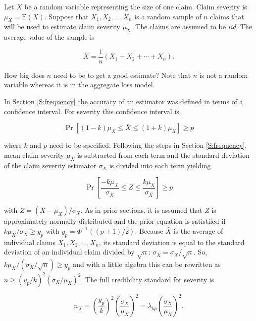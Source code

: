 \documentclass[]{book}
\theoremstyle{definition}
\theoremstyle{definition}
\theoremstyle{definition}
\theoremstyle{remark}
\begin{document}
Let \(X\) be a random variable representing the size of one claim. Claim
severity is \(\mu_X=\mathrm{E}(X)\). Suppose that
\({X_1,X_2, \ldots, X_n}\) is a random sample of \(n\) claims that will
be used to estimate claim severity \(\mu_X\). The claims are assumed to
be \emph{iid}. The average value of the sample is

\begin{equation*}
\bar{X}=\frac{1}{n}\left(X_1+X_2+\cdots+X_n\right).
\end{equation*}

How big does \(n\) need to be to get a good estimate? Note that \(n\) is
not a random variable whereas it is in the aggregate loss model.

In Section \ref{S:frequency} the accuracy of an estimator was defined in
terms of a confidence interval. For severity this confidence interval is

\begin{equation*}
\Pr[(1-k)\mu_X\leq \bar{X} \leq(1+k)\mu_X ]\geq p
\end{equation*}

\noindent where \(k\) and \(p\) need to be specified. Following the
steps in Section \ref{S:frequency}, mean claim severity \(\mu_X\) is
subtracted from each term and the standard deviation of the claim
severity estimator \(\sigma_{\bar{X}}\) is divided into each term
yielding

\begin{equation*}
\Pr\left[\frac{-k\mu_X}{\sigma_{\bar{X}}}\leq Z \leq \frac{k\mu_X}{\sigma_{\bar{X}}}\right] \geq p
\end{equation*}

with \(Z = (\bar{X}-\mu_X)/\sigma_X\). As in prior sections, it is
assumed that \(Z\) is approximately normally distributed and the prior
equation is satistifed if \(k\mu_X/\sigma_{\bar{X}}\geq y_p\) with
\(y_p=\Phi^{-1}((p+1)/2)\). Because \(\bar{X}\) is the average of
individual claims \(X_1, X_2,\dots, X_n\), its standard deviation is
equal to the standard deviation of an individual claim divided by
\(\sqrt{n}\): \(\sigma_{\bar{X}}=\sigma_X/\sqrt{n}\). So,
\(k\mu_X/(\sigma_X/\sqrt{n})\geq y_p\) and with a little algebra this
can be rewritten as \(n \geq (y_p/k)^2(\sigma_X/\mu_X)^2\). The full
credibility standard for severity is

\begin{equation}
n_X=\left(\frac{y_p}{k}\right)^2\left(\frac{\sigma_X}{\mu_X}\right)^2=\lambda_{kp}\left(\frac{\sigma_X}{\mu_X}\right)^2.
\label{eq:full-credibility-frequency}
\end{equation}
\end{document}
